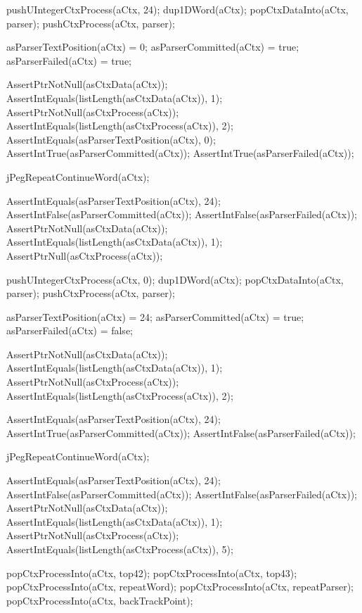 \startCTest
  pushUIntegerCtxProcess(aCtx, 24);
  dup1DWord(aCtx);
  popCtxDataInto(aCtx, parser);
  pushCtxProcess(aCtx, parser);
  
  asParserTextPosition(aCtx) = 0;
  asParserCommitted(aCtx)    = true;
  asParserFailed(aCtx)       = true;
  
  AssertPtrNotNull(asCtxData(aCtx));
  AssertIntEquals(listLength(asCtxData(aCtx)), 1);
  AssertPtrNotNull(asCtxProcess(aCtx));
  AssertIntEquals(listLength(asCtxProcess(aCtx)), 2);
  AssertIntEquals(asParserTextPosition(aCtx), 0);
  AssertIntTrue(asParserCommitted(aCtx));
  AssertIntTrue(asParserFailed(aCtx));
  
  jPegRepeatContinueWord(aCtx);
  
  AssertIntEquals(asParserTextPosition(aCtx), 24);
  AssertIntFalse(asParserCommitted(aCtx));
  AssertIntFalse(asParserFailed(aCtx));
  AssertPtrNotNull(asCtxData(aCtx));
  AssertIntEquals(listLength(asCtxData(aCtx)), 1);
  AssertPtrNull(asCtxProcess(aCtx));
\stopCTest
\stopTestCase


\startCTest
  pushUIntegerCtxProcess(aCtx, 0);
  dup1DWord(aCtx);
  popCtxDataInto(aCtx, parser);
  pushCtxProcess(aCtx, parser);
  
  asParserTextPosition(aCtx) = 24;
  asParserCommitted(aCtx)    = true;
  asParserFailed(aCtx)       = false;
  
  AssertPtrNotNull(asCtxData(aCtx));
  AssertIntEquals(listLength(asCtxData(aCtx)), 1);
  AssertPtrNotNull(asCtxProcess(aCtx));
  AssertIntEquals(listLength(asCtxProcess(aCtx)), 2);
  
  AssertIntEquals(asParserTextPosition(aCtx), 24);
  AssertIntTrue(asParserCommitted(aCtx));
  AssertIntFalse(asParserFailed(aCtx));
  
  jPegRepeatContinueWord(aCtx);
  
  AssertIntEquals(asParserTextPosition(aCtx), 24);
  AssertIntFalse(asParserCommitted(aCtx));
  AssertIntFalse(asParserFailed(aCtx));
  AssertPtrNotNull(asCtxData(aCtx));
  AssertIntEquals(listLength(asCtxData(aCtx)), 1);
  AssertPtrNotNull(asCtxProcess(aCtx));
  AssertIntEquals(listLength(asCtxProcess(aCtx)), 5);
    
  popCtxProcessInto(aCtx, top42);
  popCtxProcessInto(aCtx, top43);
  popCtxProcessInto(aCtx, repeatWord);
  popCtxProcessInto(aCtx, repeatParser);
  popCtxProcessInto(aCtx, backTrackPoint);
  
